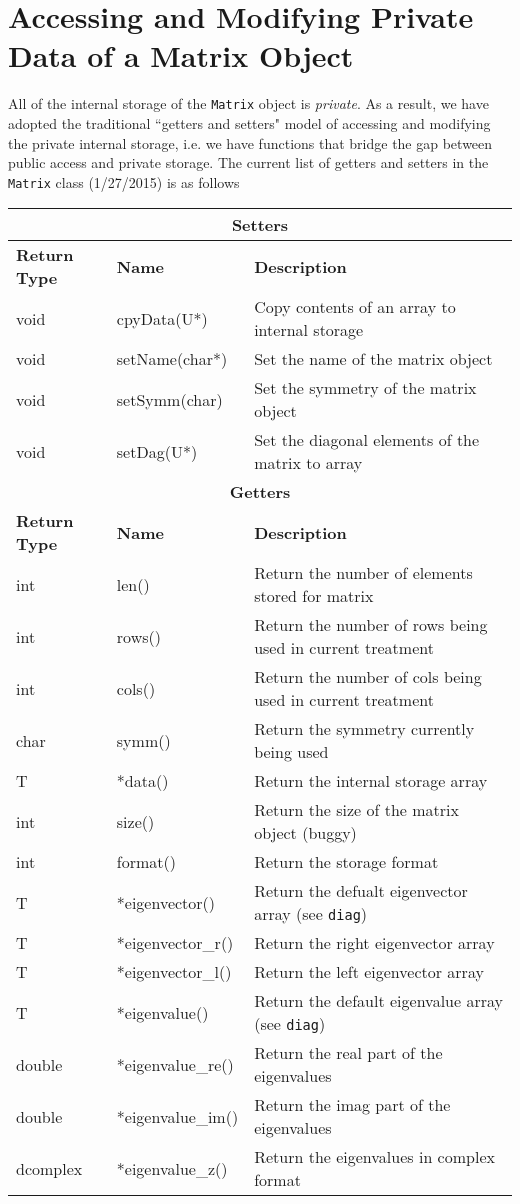 \documentclass[english,journal=jctcce,manuscript=article,etalmode=truncate,maxauthors=0]{article}
\begin{document}
\section{Accessing and Modifying Private Data of a Matrix Object}
All of the internal storage of the \texttt{Matrix} object is \emph{private}. As a result, we have adopted the traditional ``getters and setters" model of accessing and modifying the private internal storage, i.e. we have functions that bridge the gap between public access and private storage. The current list of getters and setters in the \texttt{Matrix} class (1/27/2015) is as follows
\begin{table}[h!]
\begin{tabular}{| l | l | l |}
\hline
\multicolumn{3}{|c|}{\textbf{Setters}}\\
\hline
\hline
\textbf{Return Type} & \textbf{Name} & \textbf{Description} \\
\hline
  void&cpyData(U*) &Copy contents of an array to internal storage\\
  void&setName(char*) &Set the name of the matrix object\\
  void&setSymm(char) &Set the symmetry of the matrix object\\
  void& setDag(U*) &Set the diagonal elements of the matrix to array\\
\hline
\hline
\multicolumn{3}{|c|}{\textbf{Getters}}\\
\hline
\hline
\textbf{Return Type} & \textbf{Name} & \textbf{Description} \\
\hline
  int &len() &Return the number of elements stored for matrix\\
  int &rows()& Return the number of rows being used in current treatment\\
  int &cols()& Return the number of cols being used in current treatment\\
  char& symm()& Return the symmetry currently being used\\
  T   &*data()& Return the internal storage array\\
  int & size()& Return the size of the matrix object (buggy)\\
  int &format()& Return the storage format\\
  T& *eigenvector()& Return the defualt eigenvector array (see \texttt{diag})\\
  T& *eigenvector\_r()& Return the right eigenvector array \\
  T& *eigenvector\_l()& Return the left eigenvector array  \\
  T&    *eigenvalue()& Return the default eigenvalue array (see \texttt{diag})\\
  double&  *eigenvalue\_re()& Return the real part of the eigenvalues  \\
  double&  *eigenvalue\_im()& Return the imag part of the eigenvalues  \\
  dcomplex &*eigenvalue\_z()& Return the eigenvalues in complex format\\
\hline
\end{tabular}
\end{table}
\end{document}
